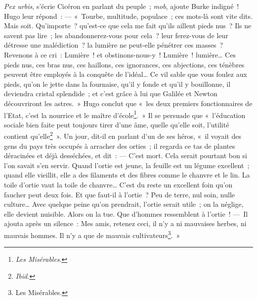 \documentclass[french,twoside]{book} %
\begin{document}
\noindent \emph{Pex urbis}, s’écrie Cicéron en parlant du peuple ; \emph{mob}, ajoute Burke indigné ! Hugo leur répond : — « Tourbe, multitude, populace ; ces mots-là sont vite dits. Mais soit. Qu’importe ? qu’est-ce que cela me fait qu’ils aillent pieds nus ? Ils ne savent pas lire ; les abandonnerez-vous pour cela ? leur ferez-vous de leur détresse une malédiction ? la lumière ne peut-elle pénétrer ces masses ? Revenons à ce cri : Lumière ! et obstinons-nous-y ! Lumière ! lumière… Ces pieds nus, ces bras nus, ces haillons, ces ignorances, ces abjections, ces ténèbres peuvent être employés à la conquête de l’idéal… Ce vil sable que vous foulez aux pieds, qu’on le jette dans la fournaise, qu’il y fonde et qu’il y bouillonne, il deviendra cristal splendide ; et c’est grâce à lui que Galilée et Newton découvriront les astres. » Hugo conclut que « les deux premiers fonctionnaires de l’Etat, c’est la nourrice et le maître d’école\footnote{\emph{Les Misérables}.}. » Il se persuade que « l’éducation sociale bien faite peut toujours tirer d’une âme, quelle qu’elle soit, l’utilité contient qu’elle\footnote{\emph{Ibid.}} ». Un jour, dit-il en parlant d’un de ses héros, « il voyait des gens du pays très occupés à arracher des orties ; il regarda ce tas de plantes déracinées et déjà desséchées, et dit : — C’est mort. Cela serait pourtant bon si l’on savait s’en servir. Quand l’ortie est jeune, la feuille est un légume excellent ; quand elle vieillit, elle a des filaments et des fibres comme le chanvre et le lin. La toile d’ortie vaut la toile de chanvre… C’est du reste un excellent foin qu’on faucher peut deux fois. Et que faut-il à l’ortie ? Peu de terre, nul soin, nulle culture… Avec quelque peine qu’on prendrait, l’ortie serait utile ; on la néglige, elle devient nuisible. Alors on la tue. Que d’hommes ressemblent à l’ortie ! — Il ajouta après un silence : Mes amis, retenez ceci, il n’y a ni mauvaises herbes, ni mauvais hommes. Il n’y a que de mauvais cultivateurs\footnote{Les Misérables.}. »\par
\end{document}

